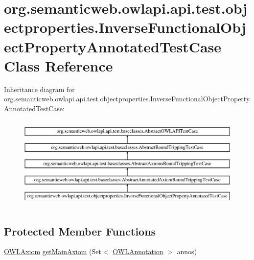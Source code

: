 \hypertarget{classorg_1_1semanticweb_1_1owlapi_1_1api_1_1test_1_1objectproperties_1_1_inverse_functional_object_property_annotated_test_case}{\section{org.\-semanticweb.\-owlapi.\-api.\-test.\-objectproperties.\-Inverse\-Functional\-Object\-Property\-Annotated\-Test\-Case Class Reference}
\label{classorg_1_1semanticweb_1_1owlapi_1_1api_1_1test_1_1objectproperties_1_1_inverse_functional_object_property_annotated_test_case}
}
Inheritance diagram for org.\-semanticweb.\-owlapi.\-api.\-test.\-objectproperties.\-Inverse\-Functional\-Object\-Property\-Annotated\-Test\-Case\-:\begin{figure}[H]
\begin{center}
\leavevmode
\includegraphics[height=4.713805cm]{classorg_1_1semanticweb_1_1owlapi_1_1api_1_1test_1_1objectproperties_1_1_inverse_functional_object_property_annotated_test_case}
\end{center}
\end{figure}
\subsection*{Protected Member Functions}
\begin{DoxyCompactItemize}
\item 
\hyperlink{interfaceorg_1_1semanticweb_1_1owlapi_1_1model_1_1_o_w_l_axiom}{O\-W\-L\-Axiom} \hyperlink{classorg_1_1semanticweb_1_1owlapi_1_1api_1_1test_1_1objectproperties_1_1_inverse_functional_object_property_annotated_test_case_aae21cc24bd7efa2b94ac56f43c6d2a96}{get\-Main\-Axiom} (Set$<$ \hyperlink{interfaceorg_1_1semanticweb_1_1owlapi_1_1model_1_1_o_w_l_annotation}{O\-W\-L\-Annotation} $>$ annos)
\end{DoxyCompactItemize}
